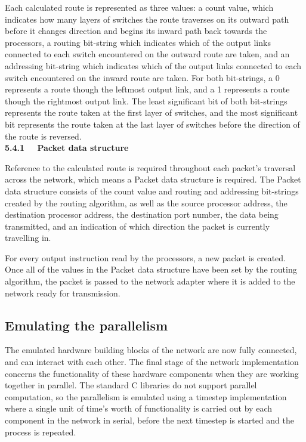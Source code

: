 \documentclass[a4paper, 12pt]{article}
\begin{document}
Each calculated route is represented as three values: a count value, which indicates how many layers of switches the route traverses on its outward path before it changes direction and begins its inward path back towards the processors, a routing bit-string which indicates which of the output links connected to each switch encountered on the outward route are taken, and an addressing bit-string which indicates which of the output links connected to each switch encountered on the inward route are taken. For both bit-strings, a 0 represents a route though the leftmost output link, and a 1 represents a route though the rightmost output link. The least significant bit of both bit-strings represents the route taken at the first layer of switches, and the most significant bit represents the route taken at the last layer of switches before the direction of the route is reversed.\\

\noindent\textbf{5.4.1 \ \ Packet data structure}

\noindent Reference to the calculated route is required throughout each packet's traversal across the network, which means a Packet data structure is required. The Packet data structure consists of the count value and routing and addressing bit-strings created by the routing algorithm, as well as the source processor address, the destination processor address, the destination port number, the data being transmitted, and an indication of which direction the packet is currently travelling in. 

For every output instruction read by the processors, a new packet is created. Once all of the values in the Packet data structure have been set by the routing algorithm, the packet is passed to the network adapter where it is added to the network ready for transmission.

\subsection{Emulating the parallelism}
\label{sec:imp_parallelism}

The emulated hardware building blocks of the network are now fully connected, and can interact with each other. The final stage of the network implementation concerns the functionality of these hardware components when they are working together in parallel. The standard C libraries do not support parallel computation, so the parallelism is emulated using a timestep implementation where a single unit of time's worth of functionality is carried out by each component in the network in serial, before the next timestep is started and the process is repeated.
\end{document}
